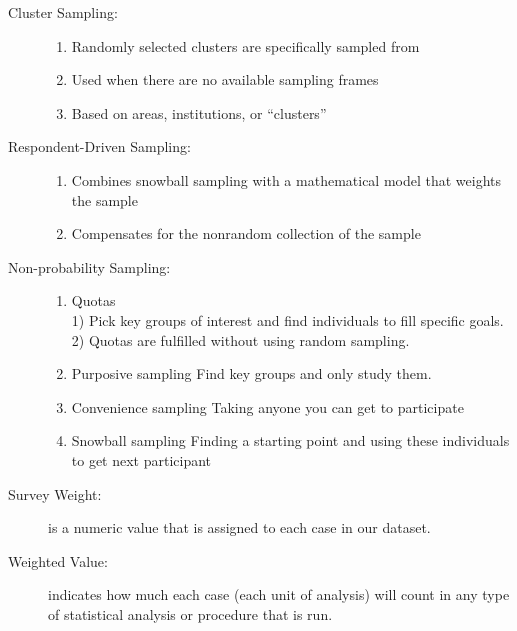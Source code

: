 \documentclass[10pt,landscape]{article}
\begin{document}
\begin{multicols}{3}
\begin{description}
\begin{enumerate}
\end{enumerate}
\item[Cluster Sampling:] \quad
\begin{enumerate}
  \item Randomly selected clusters are specifically sampled from
  \item Used when there are no available sampling frames
  \item Based on areas, institutions, or “clusters”
\end{enumerate}
\item[Respondent-Driven Sampling:] \quad
\begin{enumerate}
  \item Combines snowball sampling with a mathematical model that weights the sample
  \item Compensates for the nonrandom collection of the sample
\end{enumerate}

\item[Non-probability Sampling:] \quad
\begin{enumerate}
  \item Quotas  \quad \\
   1) Pick key groups of interest and find individuals to fill specific goals.\\
   2) Quotas are fulfilled without using random sampling.\\
  \item Purposive sampling  Find key groups and only study them.
  \item Convenience sampling  Taking anyone you can get to participate
  \item Snowball sampling  Finding a starting point and using these individuals to get next participant
\end{enumerate}


\item[Survey Weight:] is a numeric value that is assigned to each case in our dataset.
\item[Weighted Value:] indicates how much each case (each unit of analysis) will count in any type of statistical analysis or procedure that is run.


\end{description}
\end{multicols}
\end{document}
